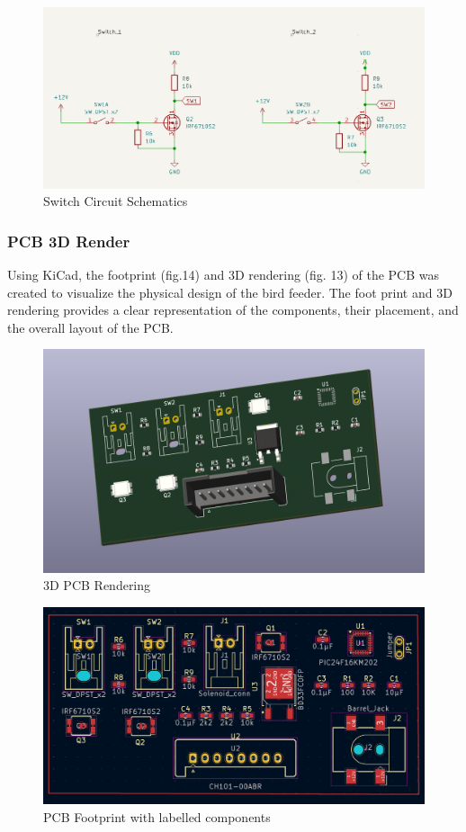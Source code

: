 \documentclass[12pt,a4paper]{article}
\begin{document}
\begin{figure}[h]
    \centering
    \includegraphics[width=.75\textwidth]{images/Switch_schematics.png}
    \caption{Switch Circuit Schematics}
\end{figure}
\subsubsection{PCB 3D Render}
Using KiCad, the footprint (fig.14) and 3D rendering (fig. 13) of the PCB was created to visualize the physical design of the bird feeder. The foot print and 3D rendering provides a clear representation of the components, their placement, and the overall layout of the PCB.
\begin{figure}[h]
    \centering
    \includegraphics[width=.75\textwidth]{images/PCB_3D.png}
    \caption{3D PCB Rendering}
\end{figure}
\begin{figure}[h]
    \centering
    \includegraphics[width=.5\textwidth]{images/PCB_Footprint.png}
    \caption{PCB Footprint with labelled components}
\end{figure}
\end{document}
